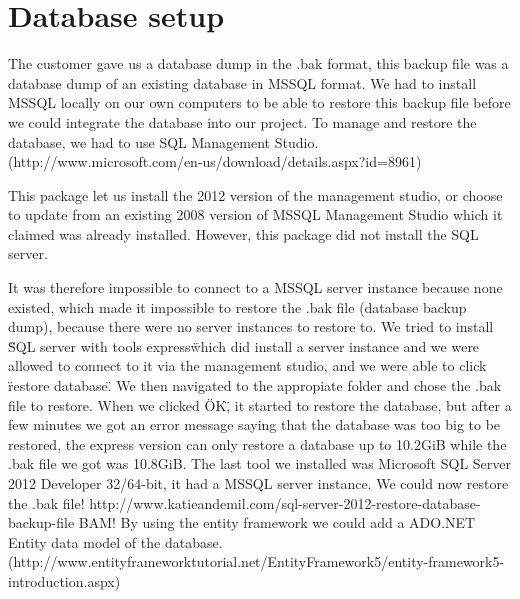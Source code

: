 \section{Database setup}
The customer gave us a database dump in the .bak format, this backup file was a database dump of an existing database in MSSQL format. We had to install MSSQL locally on our own computers to be able to restore this backup file before we could integrate the database into our project. To manage and restore the database, we had to use SQL Management Studio. (http://www.microsoft.com/en-us/download/details.aspx?id=8961)

This package let us install the 2012 version of the management studio, or choose to update from an existing 2008 version of MSSQL Management Studio which it claimed was already installed. However, this package did not install the SQL server.

It was therefore impossible to connect to a MSSQL server instance because none existed, which made it impossible to restore the .bak file (database backup dump), because there were no server instances to restore to.
We tried to install \"SQL server with tools express\" which did install a server instance and we were allowed to connect to it via the management studio, and we were able to click \"restore database\". We then navigated to the appropiate folder and chose the .bak file to restore. When we clicked \"OK\", it started to restore the database, but after a few minutes we got an error message saying that the database was too big to be restored, the express version can only restore a database up to 10.2GiB while the .bak file we got was 10.8GiB.
The last tool we installed was Microsoft SQL Server 2012 Developer 32/64-bit, it had a MSSQL server instance.
We could now restore the .bak file! http://www.katieandemil.com/sql-server-2012-restore-database-backup-file BAM!
By using the entity framework we could add a ADO.NET Entity data model of the database. (http://www.entityframeworktutorial.net/EntityFramework5/entity-framework5-introduction.aspx)